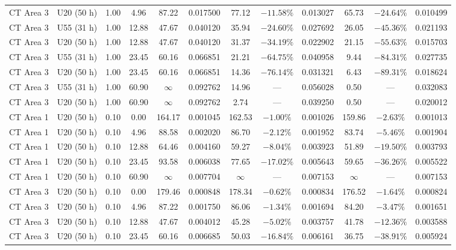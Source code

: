 \documentclass[10pt,a4paper]{article}
\begin{document}
\begin{table}[htbp]
\begin{tabular*}{\textwidth}{@{\extracolsep{\fill}}llcc|cc|ccc|ccc@{}}
CT Area 3 & U20 (50 h)    & 1.00 & 4.96  & 87.22  & 0.017500 & 77.12  & $-11.58\%$ & 0.013027 & 65.73  & $-24.64\%$ & 0.010499 \\
CT Area 3 & U55 (31 h)    & 1.00 & 12.88 & 47.67  & 0.040120 & 35.94  & $-24.60\%$ & 0.027692 & 26.05  & $-45.36\%$ & 0.021193 \\
CT Area 3 & U20 (50 h)    & 1.00 & 12.88 & 47.67  & 0.040120 & 31.37  & $-34.19\%$ & 0.022902 & 21.15  & $-55.63\%$ & 0.015703 \\
CT Area 3 & U55 (31 h)    & 1.00 & 23.45 & 60.16  & 0.066851 & 21.21  & $-64.75\%$ & 0.040958 & 9.44   & $-84.31\%$ & 0.027735 \\
CT Area 3 & U20 (50 h)    & 1.00 & 23.45 & 60.16  & 0.066851 & 14.36  & $-76.14\%$ & 0.031321 & 6.43   & $-89.31\%$ & 0.018624 \\
CT Area 3 & U55 (31 h)    & 1.00 & 60.90 & $\infty$ & 0.092762 & 14.96 & ---       & 0.056028 & 0.50   & ---        & 0.032083 \\
CT Area 3 & U20 (50 h)    & 1.00 & 60.90 & $\infty$ & 0.092762 & 2.74  & ---        & 0.039250 & 0.50   & ---        & 0.020012 \\
\midrule
CT Area 1 & U20 (50 h)    & 0.10 & 0.00  & 164.17 & 0.001045 & 162.53 & $-1.00\%$  & 0.001026 & 159.86 & $-2.63\%$  & 0.001013 \\
CT Area 1 & U20 (50 h)    & 0.10 & 4.96  & 88.58  & 0.002020 & 86.70  & $-2.12\%$  & 0.001952 & 83.74  & $-5.46\%$  & 0.001904 \\
CT Area 1 & U20 (50 h)    & 0.10 & 12.88 & 64.46  & 0.004160 & 59.27  & $-8.04\%$  & 0.003923 & 51.89  & $-19.50\%$ & 0.003793 \\
CT Area 1 & U20 (50 h)    & 0.10 & 23.45 & 93.58  & 0.006038 & 77.65  & $-17.02\%$ & 0.005643 & 59.65  & $-36.26\%$ & 0.005522 \\
CT Area 1 & U20 (50 h)    & 0.10 & 60.90 & $\infty$ & 0.007704 & $\infty$ & ---      & 0.007153 & $\infty$ & ---      & 0.007153 \\
CT Area 3 & U20 (50 h)    & 0.10 & 0.00  & 179.46 & 0.000848 & 178.34 & $-0.62\%$  & 0.000834 & 176.52 & $-1.64\%$  & 0.000824 \\
CT Area 3 & U20 (50 h)    & 0.10 & 4.96  & 87.22  & 0.001750 & 86.06  & $-1.34\%$  & 0.001694 & 84.20  & $-3.47\%$  & 0.001651 \\
CT Area 3 & U20 (50 h)    & 0.10 & 12.88 & 47.67  & 0.004012 & 45.28  & $-5.02\%$  & 0.003757 & 41.78  & $-12.36\%$ & 0.003588 \\
CT Area 3 & U20 (50 h)    & 0.10 & 23.45 & 60.16  & 0.006685 & 50.03  & $-16.84\%$ & 0.006161 & 36.75  & $-38.91\%$ & 0.005924 \\

\end{tabular*}
\end{table}
\end{document}
